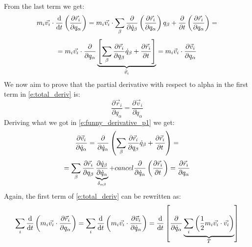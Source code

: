 From the last term we get:
\begin{equation}
    m_i\vec{v_i} \cdot \dv{}{t}\brackets{\dfrac{\partial \vec{r}_i}{\partial q_{\alpha}}} = m_i\vec{v_i} \cdot \bigsum_{\beta} \dfrac{\partial}{\partial \dot{q}_{\beta} }\brackets{\dfrac{\partial \vec{r}_i}{\partial q_{\alpha}}} q_{\beta} + \dfrac{\partial}{\partial t}\brackets{\dfrac{\partial \vec{r}_i}{\partial q_{\alpha}}} =
\end{equation}
\begin{equation} \label{e:funny_derivative_p1}
    = m_i\vec{v_i} \cdot \dfrac{\partial}{\partial q_{\alpha} }\underbrace{\left[\displaystyle\sum_{\beta} \dfrac{\partial \vec{r}_i}{\partial q_{\beta}} \dot{q}_{\beta} + \dfrac{\partial \vec{r}_i}{\partial t}\right]}_{\dot{\vec{v}}_i} = m_i\vec{v}_i \cdot \dfrac{\partial \vec{v}_i}{\partial q_{\alpha}}
\end{equation}
We now aim to prove that the partial derivative with respect to alpha in the first term in \eqref{e:total_deriv} is:
\begin{equation}
    \dfrac{\partial \vec{r}_i}{\partial q_{\alpha}} = \dfrac{\partial \vec{v}_i}{\partial \dot{q}_{\alpha}}
\end{equation}
Deriving what we got in \eqref{e:funny_derivative_p1} we get:
\begin{equation}
    \dfrac{\partial \vec{v}_i}{\partial \dot{q}_{\alpha}} = \dfrac{\partial }{\partial \dot{q}_{\alpha}} \left(\displaystyle\sum_{\beta}\dfrac{\partial \vec{r}_i}{\partial q_{\beta}} \dot{q}_{\beta} + \dfrac{\partial \vec{r}_i}{\partial t}\right) =
\end{equation}
\begin{equation}
     = \displaystyle\sum_{\beta}\dfrac{\partial \vec{r}_i}{\partial q_{\beta}} \underbrace{\dfrac{\partial \dot{q}_{\beta}}{\partial \dot{q}_{\alpha}}}_{\delta_{\alpha \beta}}  + \\cancel{\dfrac{\partial }{\partial \dot{q}_{\alpha}}\left(\dfrac{\partial \vec{r}_i}{\partial t}\right)} = \dfrac{\partial \vec{r}_i}{\partial q_{\alpha}}
\end{equation}
Again, the first term of \eqref{e:total_deriv} can be rewritten as:
\begin{equation}
    \bigsum_i \dv{}{t}\brackets{m_i\vec{v_i} \cdot \dfrac{\partial \vec{r}_i}{\partial q_{\alpha}}} = \bigsum_i\dv{}{t}\brackets{m_i\vec{v_i} \cdot \dfrac{\partial \vec{v}_i}{\partial \dot{q}_{\alpha}}} = \dv{}{t}\left[\dfrac{\partial }{\partial \dot{q}_{\alpha}} \underbrace{\bigsum_i \brackets{\dfrac{1}{2}m_i \vec{v_i} \cdot \vec{v_i}}}_{T}\right]
\end{equation}
